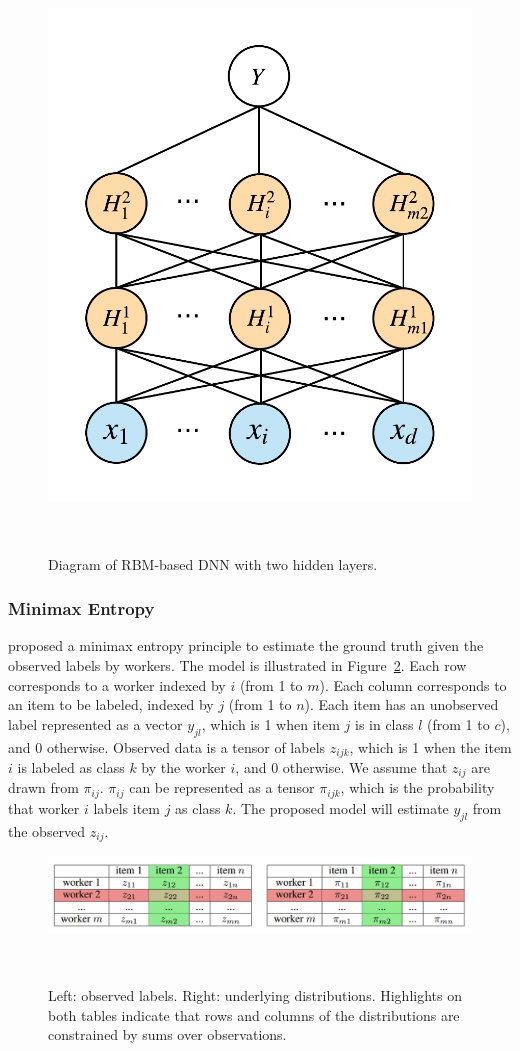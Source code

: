 \documentclass{article}
\begin{document}
\begin{figure}[h]
  \centering
  \includegraphics[width=0.75\columnwidth]{rbm-dnn.png}
  \caption{Diagram of RBM-based DNN with two hidden layers.}
  ~\label{fg:rbm-dnn-model}
\end{figure}

\subsubsection{Minimax Entropy}
\cite{Zhou2012-ry} proposed a minimax entropy principle to estimate
the ground truth given the observed labels by workers. The model is
illustrated in Figure~\ref{fg:minimax_entropy_model}. Each row
corresponds to a worker indexed by $i$ (from 1 to $m$). Each column
corresponds to an item to be labeled, indexed by $j$ (from 1 to
$n$). Each item has an unobserved label represented as a vector
$y_{jl}$, which is 1 when item $j$ is in class $l$ (from 1 to $c$),
and 0 otherwise. Observed data is a tensor of labels $z_{ijk}$, which
is 1 when the item $i$ is labeled as class $k$ by the worker $i$, and
0 otherwise. We assume that $z_{ij}$ are drawn from
$\pi_{ij}$. $\pi_{ij}$ can be represented as a tensor $\pi_{ijk}$,
which is the probability that worker $i$ labels item $j$ as class
$k$. The proposed model will estimate $y_{jl}$ from the observed
$z_{ij}$.
\begin{figure}[h]
  \centering
  \includegraphics[width=0.95\columnwidth]{minimax_entropy.png}
  \caption{Left: observed labels. Right: underlying
    distributions. Highlights on both tables indicate that rows and
    columns of the distributions are constrained by sums over observations.}
  ~\label{fg:minimax_entropy_model}
\end{figure}
\end{document}
